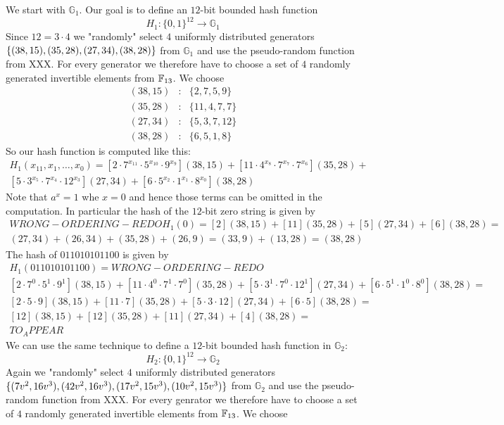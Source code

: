 We start with $\mathbb{G}_1$. Our goal is to define an $12$-bit bounded hash function
$$
H_{1}: \{0,1\}^{12} \to \mathbb{G}_1 
$$
Since $12= 3\cdot 4$ we "randomly" select $4$ uniformly distributed generators $\{(38, 15), (35,28),\\ (27, 34), (38, 28)\}$ from $\mathbb{G}_1$ and use the pseudo-random function from XXX. 
For every generator we therefore have to choose a set of $4$ randomly generated invertible elements from $\mathbb{F}_{13}$. We choose
$$
\begin{array}{lcl}
(38,15) &:& \{2,7,5,9\}\\
(35,28) &:& \{11,4,7,7\}\\
(27,34) &:& \{5,3,7,12\}\\
(38,28) &:& \{6,5,1,8\}
\end{array}
$$
So our hash function is computed like this:
\begin{multline*}
H_1(x_{11},x_1,\ldots, x_{0})=
[2\cdot 7^{x_{11}}\cdot 5^{x_{10}}\cdot 9^{x_9}](38,15)+
[11\cdot 4^{x_8}\cdot 7^{x_7}\cdot 7^{x_6}](35,28)+\\
[5\cdot 3^{x_5}\cdot 7^{x_4}\cdot 12^{x_3}](27,34) +
[6\cdot 5^{x_2}\cdot 1^{x_{1}}\cdot 8^{x_{0}}](38,28)
\end{multline*}
Note that $a^x=1$ whe $x=0$ and hence those terms can be omitted in the computation. 
In particular the hash of the $12$-bit zero string is given by 
\begin{multline*}WRONG-ORDERING-REDO
H_1(0)= [2](38,15)+[11](35,28)+[5](27,34)+[6](38,28)= \\
(27,34)+(26,34)+(35,28)+(26,9)= (33,9) + (13,28) = (38,28)
\end{multline*}
The hash of $011010101100$ is given by 
\begin{multline*}
H_1(011010101100)=WRONG-ORDERING-REDO\\
[2\cdot 7^{0}\cdot 5^{1}\cdot 9^{1}](38,15)+
[11\cdot 4^{0}\cdot 7^{1}\cdot 7^{0}](35,28)+
[5\cdot 3^{1}\cdot 7^{0}\cdot 12^{1}](27,34) +
[6\cdot 5^{1}\cdot 1^{0}\cdot 8^{0}](38,28)=\\
[2\cdot 5\cdot 9](38,15)+
[11\cdot 7](35,28)+
[5\cdot 3\cdot 12](27,34) +
[6\cdot 5](38,28)=\\
[12](38,15)+
[12](35,28)+
[11](27,34) +
[4](38,28)=\\ 
TO_APPEAR
\end{multline*}
We can use the same technique to define a $12$-bit bounded hash function in $\mathbb{G}_2$:  
$$
H_{2}: \{0,1\}^{12} \to \mathbb{G}_2 
$$
Again we "randomly" select $4$ uniformly distributed generators $\{(7v^2 , 16v^3 ), (42v^2 , 16v^3 ), \\(17v^2 , 15v^3 ), (10v^2 , 15v^3 )\}$ from $\mathbb{G}_2$ and use the pseudo-random function from XXX. For every genrator we therefore have to choose a set of $4$ randomly generated invertible elements from $\mathbb{F}_{13}$. We choose
